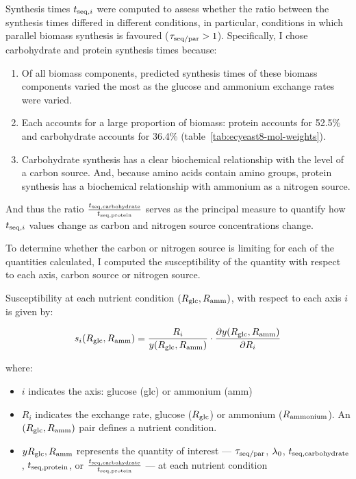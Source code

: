 Synthesis times $t_{\mathrm{seq},i}$ were computed to assess whether the ratio between the synthesis times differed in different conditions, in particular, conditions in which parallel biomass synthesis is favoured ($\tau_{\mathrm{seq}/\mathrm{par}} > 1$).
Specifically, I chose carbohydrate and protein synthesis times because:

\begin{enumerate}
  \item Of all biomass components, predicted synthesis times of these biomass components varied the most as the glucose and ammonium exchange rates were varied.
  \item Each accounts for a large proportion of biomass: protein accounts for 52.5\% and carbohydrate accounts for 36.4\% (table~\ref{tab:ecyeast8-mol-weights}).
  \item Carbohydrate synthesis has a clear biochemical relationship with the level of a carbon source.
        And, because amino acids contain amino groups, protein synthesis has a biochemical relationship with ammonium as a nitrogen source.
\end{enumerate}

And thus the ratio $\frac{t_{\mathrm{seq},\mathrm{carbohydrate}}}{t_{\mathrm{seq},\mathrm{protein}}}$ serves as the principal measure to quantify how $t_{\mathrm{seq},i}$ values change as carbon and nitrogen source concentrations change.

To determine whether the carbon or nitrogen source is limiting for each of the quantities calculated, I computed the susceptibility of the quantity with respect to each axis, carbon source or nitrogen source.

Susceptibility at each nutrient condition $(R_{\mathrm{glc}}, R_{\mathrm{amm}})$, with respect to each axis $i$ is given by:

\begin{equation}
  s_{i}(R_{\mathrm{glc}}, R_{\mathrm{amm}}) = \frac{R_{i}}{y(R_{\mathrm{glc}}, R_{\mathrm{amm}})} \cdot \frac{\partial y(R_{\mathrm{glc}}, R_{\mathrm{amm}})}{\partial R_{i}}
  \label{eq:model-susceptibility}
\end{equation}

where:
\begin{itemize}
  \item $i$ indicates the axis: glucose (glc) or ammonium (amm)
  \item $R_{i}$ indicates the exchange rate, glucose ($R_{\mathrm{glc}}$) or ammonium ($R_{\mathrm{ammonium}}$).
        An $(R_{\mathrm{glc}}, R_{\mathrm{amm}})$ pair defines a nutrient condition.
  \item $yR_{\mathrm{glc}}, R_{\mathrm{amm}}$ represents the quantity of interest --- $\tau_{\mathrm{seq}/\mathrm{par}}$, $\lambda_{0}$, $t_{\mathrm{seq},\mathrm{carbohydrate}}$, $t_{\mathrm{seq},\mathrm{protein}}$, or $\frac{t_{\mathrm{seq},\mathrm{carbohydrate}}}{t_{\mathrm{seq},\mathrm{protein}}}$ --- at each nutrient condition
\end{itemize}

